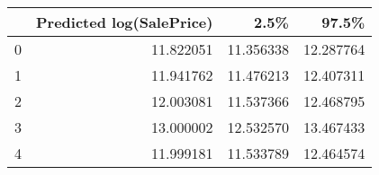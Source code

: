 \begin{tabular}{lrrr}
\toprule
{} &  Predicted log(SalePrice) &       2.5\% &      97.5\% \\
\midrule
0 &                 11.822051 &  11.356338 &  12.287764 \\
1 &                 11.941762 &  11.476213 &  12.407311 \\
2 &                 12.003081 &  11.537366 &  12.468795 \\
3 &                 13.000002 &  12.532570 &  13.467433 \\
4 &                 11.999181 &  11.533789 &  12.464574 \\
\bottomrule
\end{tabular}
